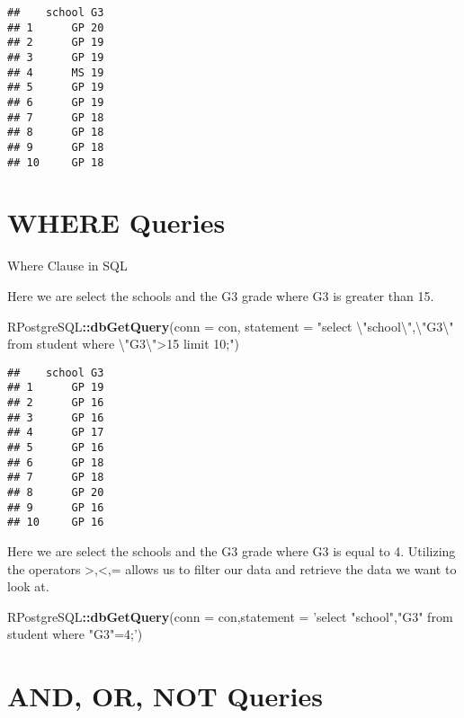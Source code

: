 \documentclass[]{book}
\newenvironment{Shaded}{\begin{snugshade}}{\end{snugshade}}
\newcommand{\KeywordTok}[1]{\textcolor[rgb]{0.13,0.29,0.53}{\textbf{#1}}}
\newcommand{\DataTypeTok}[1]{\textcolor[rgb]{0.13,0.29,0.53}{#1}}
\newcommand{\CharTok}[1]{\textcolor[rgb]{0.31,0.60,0.02}{#1}}
\newcommand{\StringTok}[1]{\textcolor[rgb]{0.31,0.60,0.02}{#1}}
\newcommand{\OperatorTok}[1]{\textcolor[rgb]{0.81,0.36,0.00}{\textbf{#1}}}
\newcommand{\NormalTok}[1]{#1}
\begin{document}
\begin{verbatim}
##    school G3
## 1      GP 20
## 2      GP 19
## 3      GP 19
## 4      MS 19
## 5      GP 19
## 6      GP 19
## 7      GP 18
## 8      GP 18
## 9      GP 18
## 10     GP 18
\end{verbatim}

\section{WHERE Queries}\label{where-queries}

Where Clause in SQL

Here we are select the schools and the G3 grade where G3 is greater than
15.

\begin{Shaded}
\begin{Highlighting}[]
\NormalTok{RPostgreSQL}\OperatorTok{::}\KeywordTok{dbGetQuery}\NormalTok{(}\DataTypeTok{conn =}\NormalTok{ con, }\DataTypeTok{statement =} \StringTok{"select }\CharTok{\textbackslash{}"}\StringTok{school}\CharTok{\textbackslash{}"}\StringTok{,}\CharTok{\textbackslash{}"}\StringTok{G3}\CharTok{\textbackslash{}"}\StringTok{ from student where }\CharTok{\textbackslash{}"}\StringTok{G3}\CharTok{\textbackslash{}"}\StringTok{>15 limit 10;"}\NormalTok{)}
\end{Highlighting}
\end{Shaded}

\begin{verbatim}
##    school G3
## 1      GP 19
## 2      GP 16
## 3      GP 16
## 4      GP 17
## 5      GP 16
## 6      GP 18
## 7      GP 18
## 8      GP 20
## 9      GP 16
## 10     GP 16
\end{verbatim}

Here we are select the schools and the G3 grade where G3 is equal to 4.
Utilizing the operators \textgreater{},\textless{},= allows us to filter
our data and retrieve the data we want to look at.

\begin{Shaded}
\begin{Highlighting}[]
\NormalTok{RPostgreSQL}\OperatorTok{::}\KeywordTok{dbGetQuery}\NormalTok{(}\DataTypeTok{conn =}\NormalTok{ con,}\DataTypeTok{statement =} \StringTok{'select "school","G3" from student where "G3"=4;'}\NormalTok{)}
\end{Highlighting}
\end{Shaded}

\section{AND, OR, NOT Queries}\label{and-or-not-queries}
\end{document}
